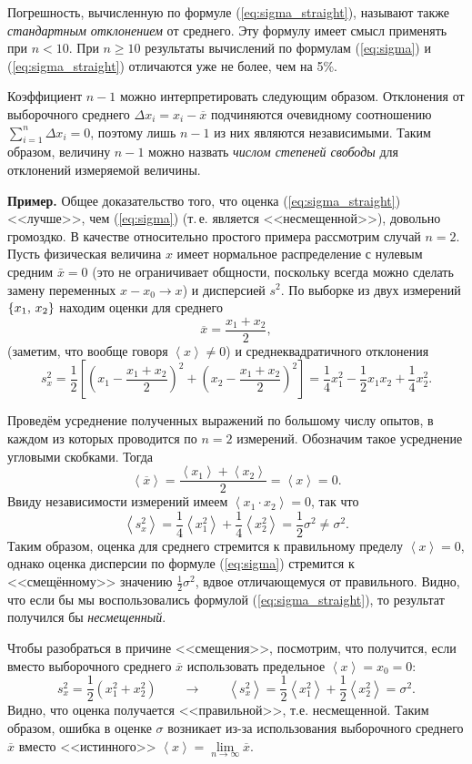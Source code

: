 Погрешность, вычисленную по формуле (\ref{eq:sigma_straight}), называют
также \emph{стандартным отклонением} от среднего. Эту формулу имеет
смысл применять при $n<10$. При $n\ge10$ результаты вычислений по
формулам (\ref{eq:sigma}) и (\ref{eq:sigma_straight}) отличаются
уже не более, чем на 5\%.

Коэффициент $n-1$ можно интерпретировать следующим образом. Отклонения
от выборочного среднего $\Delta x_{i}=x_{i}-\overline{x}$ подчиняются
очевидному соотношению $\sum\limits _{i=1}^{n}\Delta x_{i}=0$, поэтому
лишь $n-1$ из них являются независимыми. Таким образом, величину
$n-1$ можно назвать \emph{числом степеней свободы} для отклонений
измеряемой величины.

{\footnotesize
\textbf{Пример.} Общее доказательство
того, что оценка (\ref{eq:sigma_straight}) <<лучше>>,
чем (\ref{eq:sigma}) (т.\,е. является <<несмещенной>>),
довольно громоздко. В качестве относительно простого примера рассмотрим
случай $n=2$. Пусть физическая величина $x$ имеет нормальное распределение
с нулевым средним $\bar{x}=0$ (это не ограничивает общности, поскольку
всегда можно сделать замену переменных $x-x_{0}\to x$) и дисперсией
$s^{2}$. По выборке из двух измерений $\left\{ x_{1},\thinspace x_{2}\right\} $
находим оценки для среднего
\[
\overline{x}=\frac{x_{1}+x_{2}}{2},
\]
(заметим, что вообще говоря $\left\langle x\right\rangle \ne0$) и
среднеквадратичного отклонения 
\[
s_{x}^{2}=\frac{1}{2}\left[\left(x_{1}-\frac{x_{1}+x_{2}}{2}\right)^{2}+\left(x_{2}-\frac{x_{1}+x_{2}}{2}\right)^{2}\right]=\frac{1}{4}x_{1}^{2}-\frac{1}{2}x_{1}x_{2}+\frac{1}{4}x_{2}^{2}.
\]

Проведём усреднение полученных выражений по большому
числу опытов, в каждом из которых проводится по $n=2$ измерений.
Обозначим такое усреднение угловыми скобками. Тогда
\[
\left\langle \overline{x}\right\rangle =\frac{\left\langle x_{1}\right\rangle +\left\langle x_{2}\right\rangle }{2}=\left\langle x\right\rangle =0.
\]
Ввиду независимости измерений имеем $\left\langle x_{1}\cdot x_{2}\right\rangle =0$,
так что
\[
\left\langle s_{x}^{2}\right\rangle =\frac{1}{4}\left\langle x_{1}^{2}\right\rangle +\frac{1}{4}\left\langle x_{2}^{2}\right\rangle =\frac{1}{2}\sigma^{2}\ne\sigma^{2}.
\]
Таким образом, оценка для среднего стремится к правильному пределу
$\left\langle x\right\rangle =0$, однако оценка дисперсии по формуле
(\ref{eq:sigma}) стремится к <<смещённому>> значению $\frac{1}{2}\sigma^{2}$, вдвое отличающемуся от правильного.
Видно, что если бы мы воспользовались формулой (\ref{eq:sigma_straight}),
то результат получился бы 
\emph{несмещенный}.

Чтобы разобраться в причине <<смещения>>,
посмотрим, что получится, если вместо выборочного среднего $\overline{x}$
использовать предельное $\left\langle x\right\rangle =x_{0}=0$:
\[
s_{x}^{2}=\frac{1}{2}\left(x_{1}^{2}+x_{2}^{2}\right)\qquad\to\qquad\left\langle s_{x}^{2}\right\rangle =\frac{1}{2}\left\langle x_{1}^{2}\right\rangle +\frac{1}{2}\left\langle x_{2}^{2}\right\rangle =\sigma^{2}.
\]
Видно, что оценка получается <<правильной>>,
т.е. несмещенной. Таким образом, ошибка в оценке $\sigma$ возникает
из-за использования выборочного среднего $\overline{x}$ вместо <<истинного>>
$\left\langle x\right\rangle =\lim\limits_{n\to\infty}\overline{x}$.
}%

